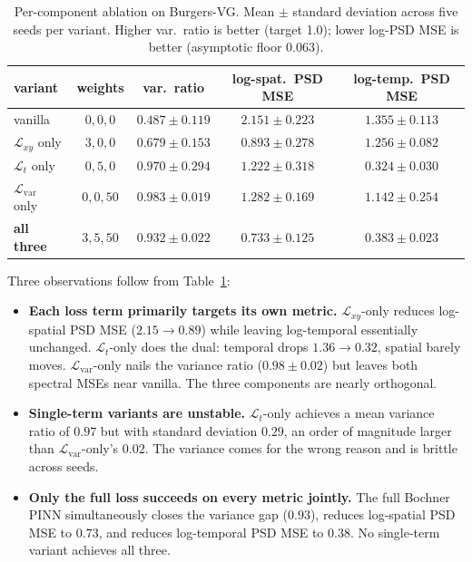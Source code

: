 \documentclass[review,12pt]{elsarticle}
\begin{document}
\begin{table}[h]
\centering
\caption{Per-component ablation on Burgers-VG. Mean $\pm$ standard
deviation across five seeds per variant. Higher var.\ ratio is
better (target 1.0); lower log-PSD MSE is better (asymptotic
floor 0.063).}
\label{tab:ablation}
\begin{tabular}{l c c c c}
\toprule
variant & weights & var.\ ratio & log-spat.\ PSD MSE & log-temp.\ PSD MSE \\
\midrule
vanilla             & $0,0,0$  & $0.487 \pm 0.119$ & $2.151 \pm 0.223$ & $1.355 \pm 0.113$ \\
$\mathcal{L}_{xy}$ only     & $3,0,0$  & $0.679 \pm 0.153$ & $0.893 \pm 0.278$ & $1.256 \pm 0.082$ \\
$\mathcal{L}_{t}$ only     & $0,5,0$  & $0.970 \pm 0.294$ & $1.222 \pm 0.318$ & $0.324 \pm 0.030$ \\
$\mathcal{L}_{\mathrm{var}}$ only & $0,0,50$ & $0.983 \pm 0.019$ & $1.282 \pm 0.169$ & $1.142 \pm 0.254$ \\
\textbf{all three}        & $3,5,50$  & $0.932 \pm 0.022$ & $0.733 \pm 0.125$ & $0.383 \pm 0.023$ \\
\bottomrule
\end{tabular}
\end{table}

Three observations follow from Table~\ref{tab:ablation}:
\begin{itemize}
\item \textbf{Each loss term primarily targets its own metric.}
$\mathcal{L}_{xy}$-only reduces log-spatial PSD MSE
($2.15 \to 0.89$) while leaving log-temporal essentially unchanged.
$\mathcal{L}_{t}$-only does the dual: temporal drops
$1.36 \to 0.32$, spatial barely moves.
$\mathcal{L}_{\mathrm{var}}$-only nails the variance ratio
($0.98 \pm 0.02$) but leaves both spectral MSEs near vanilla.
The three components are nearly orthogonal.

\item \textbf{Single-term variants are unstable.}
$\mathcal{L}_{t}$-only achieves a mean variance ratio of $0.97$
but with standard deviation $0.29$, an order of magnitude larger
than $\mathcal{L}_{\mathrm{var}}$-only's $0.02$. The variance
comes for the wrong reason and is brittle across seeds.

\item \textbf{Only the full loss succeeds on every metric jointly.}
The full Bochner PINN simultaneously closes the variance gap
($0.93$), reduces log-spatial PSD MSE to $0.73$, and reduces
log-temporal PSD MSE to $0.38$. No single-term variant achieves
all three.
\end{itemize}
\end{document}
